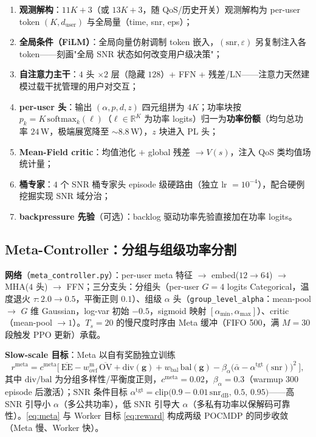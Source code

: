 \documentclass[UTF8,11pt,a4paper]{ctexart}
\theoremstyle{plain}
\theoremstyle{definition}
\theoremstyle{remark}
\newcommand{\R}{\mathbb{R}}
\newcommand{\vect}[1]{\mathbf{#1}}
\begin{document}
\begin{enumerate}
\item \textbf{观测解构}：$11K{+}3$（或 $13K{+}3$，随 QoS/历史开关）观测解构为 per-user token $(K,d_{\mathrm{user}})$ 与全局量（time, snr, eps）；
\item \textbf{全局条件（FiLM）}：全局向量仿射调制 token 嵌入，$( \mathrm{snr},\varepsilon)$ 另复制注入各 token——刻画"全局 SNR 状态如何改变用户级决策"；
\item \textbf{自注意力主干}：$4$ 头 $\times 2$ 层（隐藏 $128$）+ FFN + 残差/LN——注意力天然建模过载干扰管理的用户对交互；
\item \textbf{per-user 头}：输出 $(\alpha,p,d,z)$ 四元组拼为 $4K$；功率块按 $p_k=K\,\mathrm{softmax}_k(\ell)$（$\ell\in\R^K$ 为功率 logits）归一为\textbf{功率份额}（均匀总功率 $24$\,W，极端展宽降至 $\sim8.8$\,W），$z$ 块进入 PL 头；
\item \textbf{Mean-Field critic}：均值池化 $+$ global 残差 $\to V(s)$，注入 QoS 类均值场统计量；
\item \textbf{桶专家}：$4$ 个 SNR 桶专家头 episode 级硬路由（独立 lr $=10^{-4}$），配合硬例挖掘实现 SNR 域分治；
\item \textbf{backpressure 先验}（可选）：backlog 驱动功率先验直接加在功率 logits。
\end{enumerate}

\subsection{Meta-Controller：分组与组级功率分割} \label{sec:meta}

\textbf{网络}（\texttt{meta\_controller.py}）：per-user meta 特征 $\to$ embed($12{\to}64$) $\to$ MHA($4$ 头) $\to$ FFN；三分支头：分组头（per-user $G=4$ logits Categorical，温度退火 $\tau:2.0\to0.5$，平衡正则 $0.1$）、组级 $\alpha$ 头（\texttt{group\_level\_alpha}：mean-pool $\to$ $G$ 维 Gaussian，log-var 初始 $-0.5$，sigmoid 映射 $[\alpha_{\min},\alpha_{\max}]$）、critic（mean-pool $\to 1$）。$T_s=20$ 的慢尺度时序由 Meta 缓冲（FIFO 500，满 $M=30$ 段触发 PPO 更新）承载。

\textbf{Slow-scale 目标}：Meta 以自有奖励独立训练
\begin{equation}
  r^{\mathrm{meta}} = c^{\mathrm{meta}}\Big[\
    \overline{\mathrm{EE}} - w_{\mathrm{ovf}}^{\mathrm{m}}\,\overline{\mathrm{OV}}
    + \mathrm{div}(\vect g) + w_{\mathrm{bal}}\,\mathrm{bal}(\vect g)
    - \beta_{\alpha}\big(\bar\alpha - \alpha^{\mathrm{tgt}}(\mathrm{snr})\big)^2\ \Big],
  \label{eq:meta}
\end{equation}
其中 $\mathrm{div}/\mathrm{bal}$ 为分组多样性/平衡度正则，$c^{\mathrm{meta}}=0.02$，$\beta_{\alpha}=0.3$（warmup 300 episode 后激活）；SNR 条件目标 $\alpha^{\mathrm{tgt}}=\mathrm{clip}\big(0.9-0.01\,\mathrm{snr}_{\mathrm{dB}},\,0.5,\,0.95\big)$——高 SNR 引导小 $\alpha$（多公共功率），低 SNR 引导大 $\alpha$（多私有功率以保解码可靠性）。\eqref{eq:meta} 与 Worker 目标 \eqref{eq:reward} 构成两级 POCMDP 的同步收敛（Meta 慢、Worker 快）。
\end{document}
